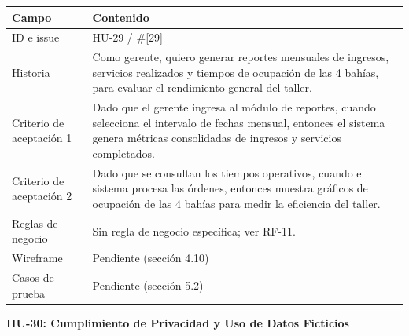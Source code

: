 {\def\LTcaptype{none} %
\begin{longtable}[]{@{}
  >{\raggedright\arraybackslash}p{}
  >{\raggedright\arraybackslash}p{}@{}}
\toprule\noalign{}
\begin{minipage}[b]{\linewidth}\raggedright
\textbf{Campo}
\end{minipage} & \begin{minipage}[b]{\linewidth}\raggedright
\textbf{Contenido}
\end{minipage} \\
\midrule\noalign{}
\endhead
\bottomrule\noalign{}
\endlastfoot
ID e issue & HU-29 / \#{[}29{]} \\
Historia & Como gerente, quiero generar reportes mensuales de ingresos,
servicios realizados y tiempos de ocupación de las 4 bahías, para
evaluar el rendimiento general del taller. \\
Criterio de aceptación 1 & Dado que el gerente ingresa al módulo de
reportes, cuando selecciona el intervalo de fechas mensual, entonces el
sistema genera métricas consolidadas de ingresos y servicios
completados. \\
Criterio de aceptación 2 & Dado que se consultan los tiempos operativos,
cuando el sistema procesa las órdenes, entonces muestra gráficos de
ocupación de las 4 bahías para medir la eficiencia del taller. \\
Reglas de negocio & Sin regla de negocio específica; ver RF-11. \\
Wireframe & Pendiente (sección 4.10) \\
Casos de prueba & Pendiente (sección 5.2) \\
\end{longtable}
}

\textbf{HU-30: Cumplimiento de Privacidad y Uso de Datos Ficticios}

